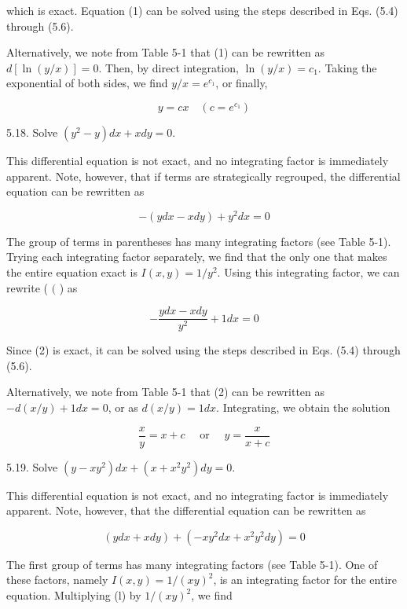 \documentclass[10pt]{article}
\begin{document}
which is exact. Equation (1) can be solved using the steps described in Eqs. (5.4) through (5.6).

Alternatively, we note from Table 5-1 that (1) can be rewritten as $d[\ln (y / x)]=0$. Then, by direct integration, $\ln (y / x)=c_{1}$. Taking the exponential of both sides, we find $y / x=e^{c_{1}}$, or finally,

$$
y=c x \quad\left(c=e^{c_{1}}\right)
$$

5.18. Solve $\left(y^{2}-y\right) d x+x d y=0$.

This differential equation is not exact, and no integrating factor is immediately apparent. Note, however, that if terms are strategically regrouped, the differential equation can be rewritten as


\begin{equation*}
-(y d x-x d y)+y^{2} d x=0 \tag{1}
\end{equation*}


The group of terms in parentheses has many integrating factors (see Table 5-1). Trying each integrating factor separately, we find that the only one that makes the entire equation exact is $I(x, y)=1 / y^{2}$. Using this integrating factor, we can rewrite ( $($ ) as


\begin{equation*}
-\frac{y d x-x d y}{y^{2}}+1 d x=0 \tag{2}
\end{equation*}


Since (2) is exact, it can be solved using the steps described in Eqs. (5.4) through (5.6).

Alternatively, we note from Table 5-1 that (2) can be rewritten as $-d(x / y)+1 d x=0$, or as $d(x / y)=1 d x$. Integrating, we obtain the solution

$$
\frac{x}{y}=x+c \quad \text { or } \quad y=\frac{x}{x+c}
$$

5.19. Solve $\left(y-x y^{2}\right) d x+\left(x+x^{2} y^{2}\right) d y=0$.

This differential equation is not exact, and no integrating factor is immediately apparent. Note, however, that the differential equation can be rewritten as


\begin{equation*}
(y d x+x d y)+\left(-x y^{2} d x+x^{2} y^{2} d y\right)=0 \tag{1}
\end{equation*}


The first group of terms has many integrating factors (see Table 5-1). One of these factors, namely $I(x, y)=1 /(x y)^{2}$, is an integrating factor for the entire equation. Multiplying (l) by $1 /(x y)^{2}$, we find
\end{document}
